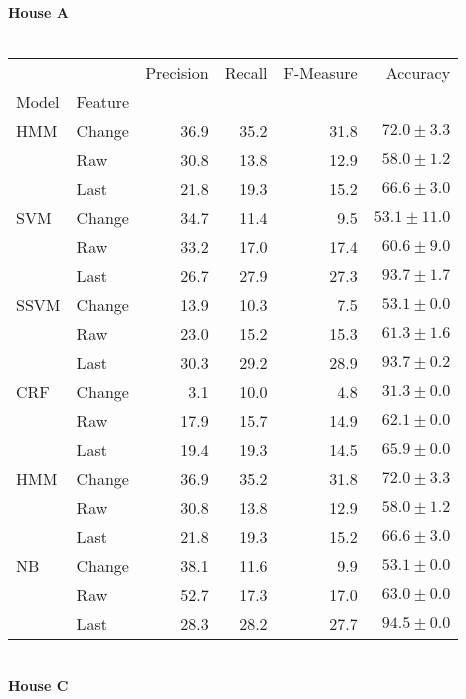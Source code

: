 \documentclass{article}
\begin{document}
\textbf{House A}\\
\vspace{1cm}\\
\begin{tabular}{llrrrr}
\toprule
    &        &  Precision &  Recall &  F-Measure &       Accuracy \\
Model & Feature &            &         &            &                \\
\midrule
HMM & Change &       36.9 &    35.2 &       31.8 &   $72.0\pm3.3$ \\
    & Raw &       30.8 &    13.8 &       12.9 &   $58.0\pm1.2$ \\
    & Last &       21.8 &    19.3 &       15.2 &   $66.6\pm3.0$ \\
SVM & Change &       34.7 &    11.4 &        9.5 &  $53.1\pm11.0$ \\
    & Raw &       33.2 &    17.0 &       17.4 &   $60.6\pm9.0$ \\
    & Last &       26.7 &    27.9 &       27.3 &   $93.7\pm1.7$ \\
SSVM & Change &       13.9 &    10.3 &        7.5 &   $53.1\pm0.0$ \\
    & Raw &       23.0 &    15.2 &       15.3 &   $61.3\pm1.6$ \\
    & Last &       30.3 &    29.2 &       28.9 &   $93.7\pm0.2$ \\
CRF & Change &        3.1 &    10.0 &        4.8 &   $31.3\pm0.0$ \\
    & Raw &       17.9 &    15.7 &       14.9 &   $62.1\pm0.0$ \\
    & Last &       19.4 &    19.3 &       14.5 &   $65.9\pm0.0$ \\
HMM & Change &       36.9 &    35.2 &       31.8 &   $72.0\pm3.3$ \\
    & Raw &       30.8 &    13.8 &       12.9 &   $58.0\pm1.2$ \\
    & Last &       21.8 &    19.3 &       15.2 &   $66.6\pm3.0$ \\
NB & Change &       38.1 &    11.6 &        9.9 &   $53.1\pm0.0$ \\
    & Raw &       52.7 &    17.3 &       17.0 &   $63.0\pm0.0$ \\
    & Last &       28.3 &    28.2 &       27.7 &   $94.5\pm0.0$ \\
\bottomrule
\end{tabular}
\vspace{1cm}\\
\textbf{House C}\\
\end{document}
